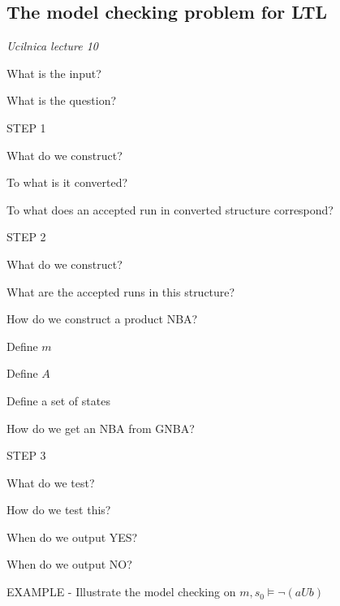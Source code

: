 \documentclass[fleqn]{article}
\begin{document}
\subsection{The model checking problem for LTL}
\textit{Ucilnica lecture 10}
\begin{enumerate}
    \item What is the input?
    {\color{blue}\item What is the question?}
    \item STEP 1
    \begin{itemize}
        {\color{blue}\item What do we construct?}
        {\color{blue}\item To what is it converted?}
        {\color{green}\item To what does an accepted run in converted structure correspond?}
    \end{itemize}
    \item STEP 2
    \begin{itemize}
        {\color{blue}\item What do we construct?}
        {\color{green}\item What are the accepted runs in this structure?}
    \end{itemize}
    \item How do we construct a product NBA?
    \begin{itemize}
        {\color{blue}\item Define $m$}
        {\color{blue}\item Define $A$}
        {\color{green}\item Define a set of states}
    \end{itemize}
    {\color{green}\item How do we get an NBA from GNBA? }
    \item STEP 3
    \begin{itemize}
        {\color{blue}\item What do we test?}
        {\color{blue}\item How do we test this?}
        {\color{blue}\item When do we output YES?}
        {\color{blue}\item When do we output NO?}
    \end{itemize}
    \item EXAMPLE - Illustrate the model checking on $m, s_0 \models \neg (a U b)$
\end{enumerate}
\end{document}
